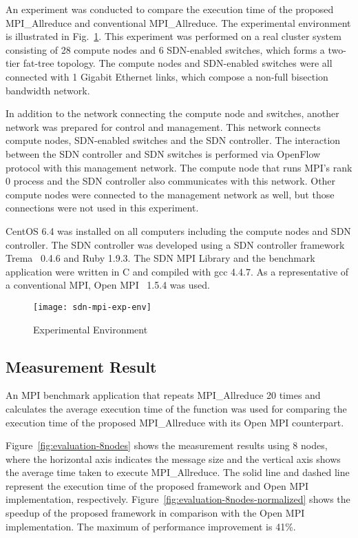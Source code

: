 An experiment was conducted to compare the execution time of the
proposed MPI\_Allreduce and conventional
MPI\_Allreduce. The experimental environment is illustrated in
Fig.~\ref{fig:experiment-environment}. This experiment was performed on
a real cluster system consisting of 28 compute nodes and 6 SDN-enabled
switches, which forms a two-tier fat-tree topology. The compute nodes
and SDN-enabled switches were all connected with 1 Gigabit Ethernet
links, which compose a non-full bisection bandwidth network.

In addition to the network connecting the compute node and switches,
another network was prepared for control and management. This network
connects compute nodes, SDN-enabled switches and the SDN controller.
The interaction between the SDN controller and SDN switches is performed
via OpenFlow protocol with this management network. The compute node
that runs MPI's rank 0 process and the SDN controller also communicates
with this network. Other compute nodes were connected to the
management network as well, but those connections were not used in this
experiment.

CentOS 6.4 was installed on all computers including the compute nodes and
SDN controller. The SDN controller was developed using a SDN controller
framework Trema~\autocite{trema} 0.4.6 and Ruby 1.9.3. The SDN
MPI Library and the benchmark application were written in C and
compiled with gcc 4.4.7. As a representative of a conventional MPI,
Open MPI~\autocite{Gabriel2004} 1.5.4 was used.

\begin{figure}
    \centering
    \texttt{[image: sdn-mpi-exp-env]}
    \caption{Experimental Environment}%
    \label{fig:experiment-environment}
\end{figure}

\subsection{Measurement Result}

An MPI benchmark application that repeats MPI\_Allreduce 20
times and calculates the average execution time of the function was used
for comparing the execution time of the proposed MPI\_Allreduce
with its Open MPI counterpart.

Figure~\ref{fig:evaluation-8nodes} shows the measurement results using 8
nodes, where the horizontal axis indicates the message size and the
vertical axis shows the average time taken to execute
MPI\_Allreduce. The solid line and dashed line represent the
execution time of the proposed framework and Open MPI implementation,
respectively. Figure~\ref{fig:evaluation-8nodes-normalized} shows the
speedup of the proposed framework in comparison with the Open MPI
implementation. The maximum of performance improvement is 41\%.

